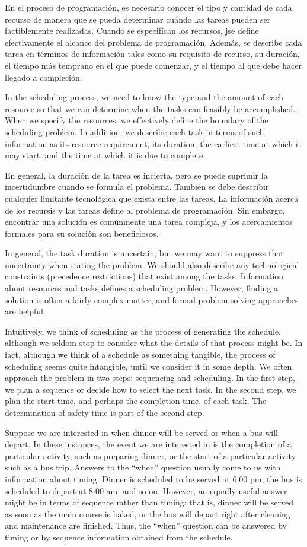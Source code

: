 \documentclass[draft,12pt,headsepline,footsepline,paper=letter]{scrreprt}
\begin{document}
En el proceso de programación, es necesario conocer el tipo y cantidad de cada recurso de manera que se pueda determinar cuándo las tareas pueden ser factiblemente realizadas. Cuando se especifícan los recursos, jse define efectivamente el alcance del problema de programación. Además, se describe cada tarea en términos de información tales como su requisito de recurso, su duración, el tiempo más temprano en el que puede comenzar, y el tiempo al que debe hacer llegado a compleción.

In the scheduling process, we need to know the type and the amount of each resource so that we can determine when the tasks can feasibly be accomplished. When we specify the resources, we effectively define the boundary of the scheduling problem. In addition, we describe each task in terms of such information as its resource requirement, its duration, the earliest time at which it may start, and the time at which it is due to complete. 

En general, la duración de la tarea es incierta, pero se puede suprimir la incertidumbre cuando se formula el problema. También se debe describir cualquier limitante tecnológica que exista entre las tareas. La información acerca de los recursis y las tareas define al problema de programación. Sin embargo, encontrar una solución es comúnmente una tarea compleja, y los acercamientos formales para su solución son beneficiosos.

In general, the task duration is uncertain, but we may want to suppress that uncertainty when stating the problem. We should also describe any technological constraints (precedence restrictions) that exist among the tasks. Information about resources and tasks defines a scheduling problem. However, finding a solution is often a fairly complex matter, and formal problem-solving approaches are helpful.

Intuitively, we think of scheduling as the process of generating the schedule, although we seldom stop to consider what the details of that process might be. In fact, although we think of a schedule as something tangible, the process of scheduling seems quite intangible, until we consider it in some depth. We often approach the problem in two steps: sequencing and scheduling. In the first step, we plan a sequence or decide how to select the next task. In the second step, we plan the start time, and perhaps the completion time, of each task. The determination of safety time is part of the second step.

Suppose we are interested in when dinner will be served or when a bus will depart. In these instances, the event we are interested in is the completion of a particular activity, such as preparing dinner, or the start of a particular activity such as a bus trip. Answers to the “when” question usually come to us with information about timing. Dinner is scheduled to be served at 6:00 pm, the bus is scheduled to depart at 8:00 am, and so on. However, an equally useful answer might be in terms of sequence rather than timing: that is, dinner will be served as soon as the main course is baked, or the bus will depart right after cleaning and maintenance are finished. Thus, the “when” question can be answered by timing or by sequence information obtained from the schedule.
\end{document}
